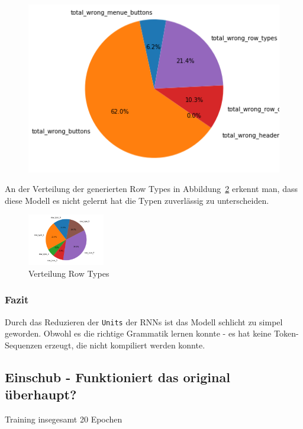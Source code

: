 \documentclass[pdftex,a4paper,halfparskip, article]{scrartcl}
\begin{document}
\begin{figure}
\begin{minipage}{.33\textwidth}
\end{minipage}
\begin{minipage}{.33\textwidth}
  \centering
   \includegraphics[width=1\linewidth]{predictions_bin16_p80_error_types_pie_chart}
  \label{fig:fehler_schlechteste20_bin16}
\end{minipage}
\end{figure}

An der Verteilung der generierten Row Types in Abbildung~\ref{fig:bin16_row_type} erkennt man, dass diese Modell es nicht gelernt hat die Typen zuverlässig zu unterscheiden.

\begin{figure}[h]
\centering
\includegraphics[width=0.3\textwidth]{predictions_bin16_predicted_row_type_distribution}
\caption{Verteilung Row Types}
\label{fig:bin16_row_type}
\end{figure}

\subsubsection*{Fazit}
Durch das Reduzieren der \texttt{Units} der RNNs ist das Modell schlicht zu simpel geworden. Obwohl es die richtige Grammatik lernen konnte - es hat keine Token-Sequenzen erzeugt, die nicht kompiliert werden konnte.


\subsection{Einschub - Funktioniert das original überhaupt?}
Training insegesamt 20 Epochen
\end{document}
